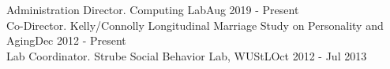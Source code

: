\begin{samepage}\begin{rSection}{\textrm{Administration}}
Director. \R Computing Lab\hfill{Aug 2019 - Present}\smallskip\\
Co-Director. Kelly/Connolly Longitudinal Marriage Study on Personality and Aging\hfill{Dec 2012 - Present}\smallskip\\
Lab Coordinator. Strube Social Behavior Lab,  WUStL\hfill {Oct 2012 - Jul 2013}\end{rSection}\end{samepage}%